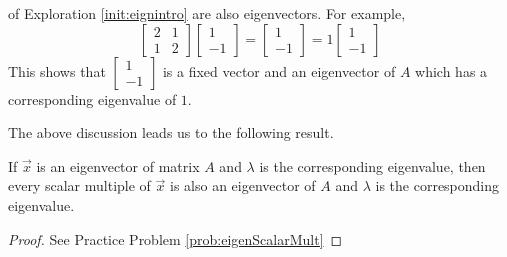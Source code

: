\documentclass{ximera}
\begin{document}
\begin{center}
\end{center}
    
 of Exploration \ref{init:eignintro} are also eigenvectors.
For example, 
$$\begin{bmatrix} 2& 1\\ 1&2 \end{bmatrix} \begin{bmatrix} 1\\ -1 \end{bmatrix} =
\begin{bmatrix} 1\\ -1 \end{bmatrix}= 1 \begin{bmatrix} 1\\ -1 \end{bmatrix}$$
This shows that $\begin{bmatrix} 1\\ -1 \end{bmatrix}$ is a fixed vector and an eigenvector of $A$ which has a corresponding eigenvalue of $1$.
    
The above discussion leads us to the following result.
    
\begin{theorem}\label{th:eigenScalarMult}
    If $\vec{x}$ is an eigenvector of matrix $A$ and $\lambda$ is the corresponding eigenvalue, then every scalar multiple of $\vec{x}$ is also an eigenvector of $A$
    and $\lambda$ is the corresponding eigenvalue.
\end{theorem}
\begin{proof}
See Practice Problem \ref{prob:eigenScalarMult}
\end{proof}
    
\end{document}
